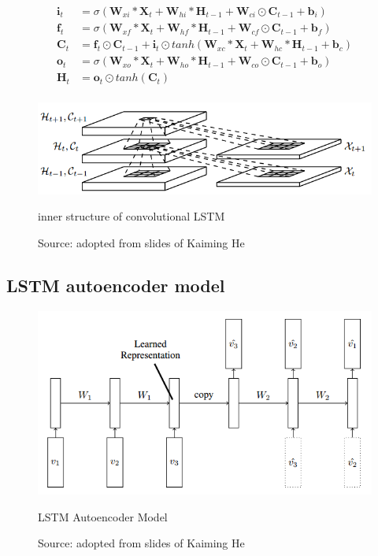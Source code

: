 \documentclass[twoside,a4paper,article]{combine}
\begin{document}
\begin{align*}
    \mathbf{i}_t &= \sigma(\mathbf{W}_{xi} \ast \mathbf{X}_t + 
                        \mathbf{W}_{hi} \ast \mathbf{H}_{t-1} + \mathbf{W}_{ci} \odot \mathbf{C}_{t-1}+ \mathbf{b}_i) \\
    \mathbf{f}_t &= \sigma(\mathbf{W}_{xf} \ast \mathbf{X}_t + 
                        \mathbf{W}_{hf} \ast \mathbf{H}_{t-1} + \mathbf{W}_{cf} \odot \mathbf{C}_{t-1}+ \mathbf{b}_f) \\
    \mathbf{C}_t &= \mathbf{f}_t \odot \mathbf{C}_{t-1} + \mathbf{i}_t \odot tanh(\mathbf{W}_{xc} \ast \mathbf{X}_t +
                        \mathbf{W}_{hc} \ast \mathbf{H}_{t-1} + \mathbf{b}_c) \\
    \mathbf{o}_t &= \sigma(\mathbf{W}_{xo}\ast\mathbf{X}_t + 
                        \mathbf{W}_{ho}\ast\mathbf{H}_{t-1} + \mathbf{W}_{co}\odot\mathbf{C}_{t-1}+ \mathbf{b}_o) \\
    \mathbf{H}_t &= \mathbf{o}_t \odot tanh(\mathbf{C}_t) \\
\end{align*}


\begin{figure}[ht!]
    \includegraphics[width=\linewidth]{convlstm}
    \caption{inner structure of convolutional LSTM}
    \caption*{Source: adopted from slides of Kaiming He}
    \label{fig:convlstm}
\end{figure}

\subsection{LSTM autoencoder model}

\begin{figure}[ht!]
    \includegraphics[width=\linewidth]{autoencoder}
    \caption{LSTM Autoencoder Model}
    \caption*{Source: adopted from slides of Kaiming He}
    \label{fig:autoencoder}
\end{figure}
\end{document}
